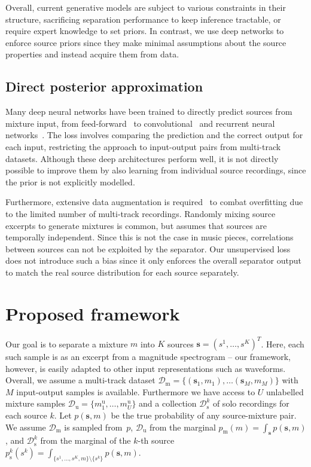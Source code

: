 \documentclass{article}
\begin{document}
Overall, current generative models are subject to various constraints in their structure, sacrificing separation performance to keep inference tractable, or require expert knowledge to set priors.
In contrast, we use deep networks to enforce source priors since they make minimal assumptions about the source properties and instead acquire them from data.

\subsection{Direct posterior approximation}

Many deep neural networks have been trained to directly predict sources from mixture input, from feed-forward~\cite{Nugraha2016} to convolutional~\cite{Simpson2015,Miron2017} and recurrent neural networks~\cite{Huang2014, Luo2017, Uhlich2017}.
The loss involves comparing the prediction and the correct output for each input, restricting the approach to input-output pairs from multi-track datasets.
Although these deep architectures perform well, it is not directly possible to improve them by also learning from individual source recordings, since the prior is not explicitly modelled.

Furthermore, extensive data augmentation is required~\cite{Uhlich2017, Miron2017} to combat overfitting due to the limited number of multi-track recordings.
Randomly mixing source excerpts to generate mixtures is common, but assumes that sources are temporally independent.
Since this is not the case in music pieces, correlations between sources can not be exploited by the separator.
Our unsupervised loss does not introduce such a bias since it only enforces the overall separator output to match the real source distribution for each source separately.

\section{Proposed framework}
\label{sec:format}

Our goal is to separate a mixture $m$ into $K$ sources $\mathbf{s} = (s^1, \ldots, s^K)^T$.
Here, each such sample is as an excerpt from a magnitude spectrogram -- our framework, however, is easily adapted to other input representations such as waveforms.
Overall, we assume a multi-track dataset $\mathcal{D}_{\text{m}} = \{(\mathbf{s}_1, m_1), \ldots (\mathbf{s}_M, m_M)\}$ with $M$ input-output samples is available.
Furthermore we have access to $U$ unlabelled mixture samples $\mathcal{D}_{\text{u}} = \{m^{\text{u}}_1, \ldots, m^{\text{u}}_U\}$ and a collection $\mathcal{D}_{\text{s}}^k$ of solo recordings for each source $k$.
Let $p(\mathbf{s},m)$ be the true probability of any source-mixture pair.
We assume $\mathcal{D}_{\text{m}}$ is sampled from~$p$, $\mathcal{D}_{\text{u}}$ from the marginal $p_{\text{m}}(m) = \int_{\mathbf{s}} p(\mathbf{s}, m)$, and $\mathcal{D}_{\text{s}}^k$ from the marginal of the $k$-th source $p_{\text{s}}^k(s^k) = \int_{\{s^1,\ldots,s^K,m\}\setminus\{s^k\}} p(\mathbf{s},m)$.
\end{document}
